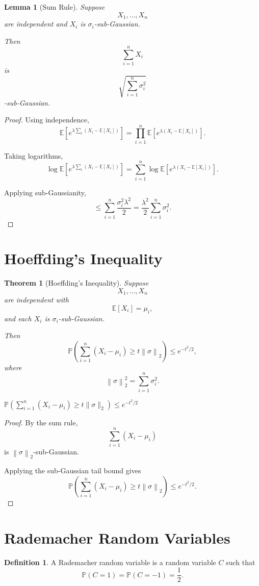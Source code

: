 \documentclass[12pt,oneside]{book}
\numberwithin{equation}{section}
\theoremstyle{definition}
\newtheorem{definition}{Definition}[section]
\theoremstyle{plain}
\newtheorem{theorem}{Theorem}[section]
\newtheorem{lemma}{Lemma}[section]
\theoremstyle{remark}
\newcommand{\E}{\mathbb{E}}
\newcommand{\Prob}{\mathbb{P}}
\newcommand{\norm}[1]{\left\lVert #1 \right\rVert}
\begin{document}
\begin{lemma}[Sum Rule]
Suppose
\[
X_1,\dots,X_n
\]
are independent and $X_i$ is $\sigma_i$-sub-Gaussian.

Then
\[
\sum_{i=1}^n X_i
\]
is
\[
\sqrt{\sum_{i=1}^n \sigma_i^2}
\]
-sub-Gaussian.
\end{lemma}

\begin{proof}
Using independence,
\[
\E\left[
e^{\lambda\sum_i(X_i-\E[X_i])}
\right]
=
\prod_{i=1}^n
\E[e^{\lambda(X_i-\E[X_i])}].
\]

Taking logarithms,
\[
\log\E\left[
e^{\lambda\sum_i(X_i-\E[X_i])}
\right]
=
\sum_{i=1}^n
\log\E[e^{\lambda(X_i-\E[X_i])}].
\]

Applying sub-Gaussianity,
\[
\leq
\sum_{i=1}^n
\frac{\sigma_i^2\lambda^2}{2}
=
\frac{\lambda^2}{2}
\sum_{i=1}^n \sigma_i^2.
\]
\end{proof}

\section{Hoeffding's Inequality}

\begin{theorem}[Hoeffding's Inequality]
Suppose
\[
X_1,\dots,X_n
\]
are independent with
\[
\E[X_i]=\mu_i,
\]
and each $X_i$ is $\sigma_i$-sub-Gaussian.

Then
\[
\Prob\left(
\sum_{i=1}^n (X_i-\mu_i)
\geq
t\norm{\sigma}_2
\right)
\leq
e^{-t^2/2},
\]
where
\[
\norm{\sigma}_2^2
=
\sum_{i=1}^n \sigma_i^2.
\]
\end{theorem}

$\mathbb{P}\left(\sum_{i=1}^n (X_i-\mu_i)\ge t\|\sigma\|_2\right)\le e^{-t^2/2}$

\begin{proof}
By the sum rule,
\[
\sum_{i=1}^n (X_i-\mu_i)
\]
is $\norm{\sigma}_2$-sub-Gaussian.

Applying the sub-Gaussian tail bound gives
\[
\Prob\left(
\sum_{i=1}^n (X_i-\mu_i)
\geq
t\norm{\sigma}_2
\right)
\leq
e^{-t^2/2}.
\]
\end{proof}

\section{Rademacher Random Variables}

\begin{definition}
A Rademacher random variable is a random variable $C$ such that
\[
\Prob(C=1)=\Prob(C=-1)=\frac12.
\]
\end{definition}
\end{document}
